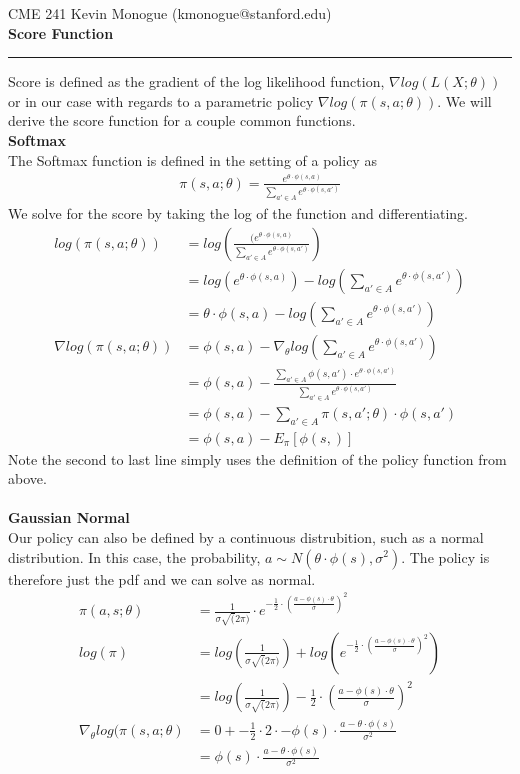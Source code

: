 \documentclass{article}
\makeatletter
\newcommand{\MyName}{Kevin Monogue (kmonogue@stanford.edu)}
\newcommand{\PrintFirstHeader}{
  CME 241 \vspace{5pt} \hfill {\Large{\MyName}}
  \\
  {\LARGE{\textbf{Score Function}}} 

  \rule{\textwidth}{0.4pt}}
\makeatother
\begin{document}
\thispagestyle{firstpage}
\PrintFirstHeader{}

Score is defined as the gradient of the log likelihood function, $\nabla log (L(X; \theta))$ or in our case with regards to a parametric policy $\nabla log (\pi(s, a; \theta))$. We will derive the score function for a couple common functions. \\
\textbf{Softmax}\\
The Softmax function is defined in the setting of a policy as 
\begin{align*}
\pi(s, a; \theta) = \frac{e^{\theta \cdot \phi(s, a)}}{\sum_{a' \in A} e^{\theta \cdot \phi(s, a')} }
\end{align*} 
We solve for the score by taking the log of the function and differentiating.
\begin{align*}
log (\pi(s, a; \theta)) & = log(\frac{(e^{\theta \cdot \phi(s, a)}}{\sum_{a' \in A} e^{\theta \cdot \phi(s, a')} }) \\
& = log(e^{\theta \cdot \phi(s, a)}) - log(\sum_{a' \in A} e^{\theta \cdot \phi(s, a')}) \\
& = \theta \cdot \phi(s, a) - log(\sum_{a' \in A} e^{\theta \cdot \phi(s, a')}) \\
\nabla log (\pi(s, a; \theta)) & = \phi(s, a) - \nabla_{\theta} log(\sum_{a' \in A} e^{\theta \cdot \phi(s, a')}) \\
& = \phi(s, a) - \frac{\sum_{a' \in A} \phi(s, a') \cdot e^{\theta \cdot \phi(s, a')}}{\sum_{a' \in A} e^{\theta \cdot \phi(s, a')}}\\
& = \phi(s, a) - \sum_{a' \in A} \pi(s, a'; \theta) \cdot \phi(s, a') \\
& = \phi(s, a) - E_{\pi}[\phi(s, )]
\end{align*}
Note the second to last line simply uses the definition of the policy function from above.  \\\\
\textbf{Gaussian Normal} \\
Our policy can also be defined by a continuous distrubition, such as a normal distribution. In this case, the probability, $a \sim N(\theta \cdot \phi(s), \sigma ^2)$. The policy is therefore just the pdf and we can solve as normal.
\begin{align*}
\pi(a, s; \theta) & = \frac{1}{\sigma \sqrt(2\pi)} \cdot e^{-\frac{1}{2} \cdot (\frac{a - \phi(s) \cdot \theta}{\sigma})^2} \\
log(\pi) & = log(\frac{1}{\sigma \sqrt(2\pi)} ) + log(e^{-\frac{1}{2} \cdot (\frac{a - \phi(s) \cdot \theta}{\sigma})^2}) \\
& = log(\frac{1}{\sigma \sqrt(2\pi)} )  -\frac{1}{2} \cdot (\frac{a - \phi(s) \cdot \theta}{\sigma})^2 \\
\nabla_{\theta} log(\pi(s, a; \theta) & = 0 + -\frac{1}{2} \cdot 2 \cdot -\phi(s) \cdot \frac{a - \theta \cdot \phi(s)}{\sigma^2} \\
& = \phi(s) \cdot \frac{a - \theta \cdot \phi(s)}{\sigma^2}
\end{align*}
\end{document}
